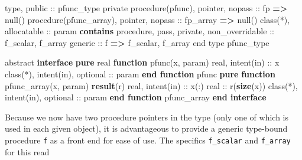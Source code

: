 \documentclass[
  paper=a4,
  ,captions=tableheading
]{scrartcl}
\newenvironment{Shaded}{\begin{snugshade}}{\end{snugshade}}
\newcommand{\DataTypeTok}[1]{\textcolor[rgb]{0.13,0.29,0.53}{#1}}
\newcommand{\FunctionTok}[1]{\textcolor[rgb]{0.13,0.29,0.53}{\textbf{#1}}}
\newcommand{\KeywordTok}[1]{\textcolor[rgb]{0.13,0.29,0.53}{\textbf{#1}}}
\newcommand{\NormalTok}[1]{#1}
\newcommand{\OperatorTok}[1]{\textcolor[rgb]{0.81,0.36,0.00}{\textbf{#1}}}
\begin{document}
\begin{Shaded}
\begin{Highlighting}[]
\DataTypeTok{type}\NormalTok{, }\DataTypeTok{public} \DataTypeTok{::}\NormalTok{ pfunc\_type}
  \DataTypeTok{private}
  \DataTypeTok{procedure(pfunc)}\NormalTok{, }\DataTypeTok{pointer}\NormalTok{, }\DataTypeTok{nopass} \DataTypeTok{::}\NormalTok{ fp }\KeywordTok{=}\OperatorTok{\textgreater{}}\NormalTok{ null()}
  \DataTypeTok{procedure(pfunc\_array)}\NormalTok{, }\DataTypeTok{pointer}\NormalTok{, }\DataTypeTok{nopass} \DataTypeTok{::}\NormalTok{ fp\_array }\KeywordTok{=}\OperatorTok{\textgreater{}}\NormalTok{ null()}
  \DataTypeTok{class(*)}\NormalTok{, }\DataTypeTok{allocatable} \DataTypeTok{::}\NormalTok{ param}
\KeywordTok{contains}
  \DataTypeTok{procedure}\NormalTok{, }\DataTypeTok{pass}\NormalTok{, }\DataTypeTok{private}\NormalTok{, }\DataTypeTok{non\_overridable} \DataTypeTok{::}\NormalTok{ f\_scalar, f\_array}
  \DataTypeTok{generic} \DataTypeTok{::}\NormalTok{ f }\KeywordTok{=}\OperatorTok{\textgreater{}}\NormalTok{ f\_scalar, f\_array}
\DataTypeTok{end type}\NormalTok{ pfunc\_type}

\DataTypeTok{abstract} \KeywordTok{interface}
  \KeywordTok{pure} \DataTypeTok{real} \KeywordTok{function}\NormalTok{ pfunc(x, param)}
    \DataTypeTok{real}\NormalTok{, }\DataTypeTok{intent(in)} \DataTypeTok{::}\NormalTok{ x}
    \DataTypeTok{class(*)}\NormalTok{, }\DataTypeTok{intent(in)}\NormalTok{, }\DataTypeTok{optional} \DataTypeTok{::}\NormalTok{ param}
  \KeywordTok{end function}\NormalTok{ pfunc}
  \KeywordTok{pure} \KeywordTok{function}\NormalTok{ pfunc\_array(x, param) }\KeywordTok{result}\NormalTok{(r)}
    \DataTypeTok{real}\NormalTok{, }\DataTypeTok{intent(in)} \DataTypeTok{::}\NormalTok{ x(:)}
    \DataTypeTok{real} \DataTypeTok{::}\NormalTok{ r(}\FunctionTok{size}\NormalTok{(x))}
    \DataTypeTok{class(*)}\NormalTok{, }\DataTypeTok{intent(in)}\NormalTok{, }\DataTypeTok{optional} \DataTypeTok{::}\NormalTok{ param}
  \KeywordTok{end function}\NormalTok{ pfunc\_array}
\KeywordTok{end interface}
\end{Highlighting}
\end{Shaded}

Because we now have two procedure pointers in the type (only one of
which is used in each given object), it is advantageous to provide a
generic type-bound procedure \texttt{f} as a front end for ease of use.
The specifics \texttt{f\_scalar} and \texttt{f\_array} for this read
\end{document}
